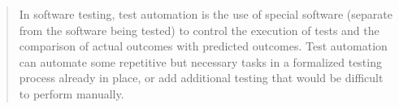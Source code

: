 \begin{frame}{\subsecname}
  \blockquote[{\cite[Wikipedia]{_test_2014}}]{
    In software testing, test automation is the use of special software
    (separate from the software being tested) to control the execution of
    tests and the comparison of actual outcomes with predicted outcomes. Test
    automation can automate some repetitive but necessary tasks in a
    formalized testing process already in place, or add additional testing
    that would be difficult to perform manually.
  }
\end{frame}
